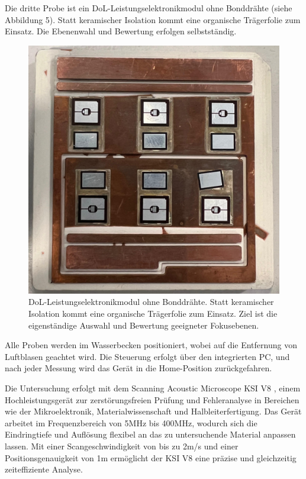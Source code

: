 Die dritte Probe ist ein DoL-Leistungselektronikmodul ohne Bonddrähte (siehe Abbildung 5). Statt keramischer Isolation kommt eine organische Trägerfolie zum Einsatz. Die Ebenenwahl und Bewertung erfolgen selbstständig.
\begin{figure}[H]
    \centering
    \includegraphics[scale=0.13]{Bilder/probe3}
    \caption{DoL-Leistungselektronikmodul ohne Bonddrähte. Statt keramischer Isolation kommt eine organische Trägerfolie zum Einsatz. Ziel ist die eigenständige Auswahl und Bewertung geeigneter Fokusebenen.}
    \vspace{0.2cm}
    \label{Abb.5: DoL-Leistungselektronikmodul ohne Bonddrähte. Statt keramischer Isolation kommt eine organische Trägerfolie zum Einsatz. Ziel ist die eigenständige Auswahl und Bewertung geeigneter Fokusebenen. }
\end{figure} 
\vspace{0.2cm}
Alle Proben werden im Wasserbecken positioniert, wobei auf die Entfernung von Luftblasen geachtet wird. Die Steuerung erfolgt über den integrierten PC, und nach jeder Messung wird das Gerät in die Home-Position zurückgefahren.



Die Untersuchung erfolgt mit dem Scanning Acoustic Microscope KSI V8 \cite{2}, einem Hochleistungsgerät zur zerstörungsfreien Prüfung und Fehleranalyse in Bereichen wie der Mikroelektronik, Materialwissenschaft und Halbleiterfertigung. Das Gerät arbeitet im Frequenzbereich von 5MHz bis 400MHz, wodurch sich die Eindringtiefe und Auflösung flexibel an das zu untersuchende Material anpassen lassen. Mit einer Scangeschwindigkeit von bis zu 2m/s und einer Positionsgenauigkeit von 1m ermöglicht der KSI V8 eine präzise und gleichzeitig zeiteffiziente Analyse.

